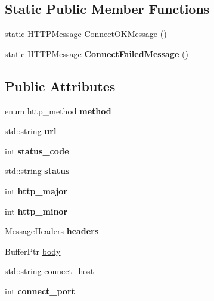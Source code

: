 \subsection*{Static Public Member Functions}
\begin{DoxyCompactItemize}
\item 
static \hyperlink{class_h_t_t_p_message}{H\+T\+T\+P\+Message} \hyperlink{class_h_t_t_p_message_af0ceacfc73f35fe05767205dce0e2a83}{Connect\+O\+K\+Message} ()
\item 
\mbox{\label{class_h_t_t_p_message_ae1eb6e84f448fdf85fda695e0b6b630b}} 
static \hyperlink{class_h_t_t_p_message}{H\+T\+T\+P\+Message} {\bfseries Connect\+Failed\+Message} ()
\end{DoxyCompactItemize}
\subsection*{Public Attributes}
\begin{DoxyCompactItemize}
\item 
\mbox{\label{class_h_t_t_p_message_adadaa62e7320300c7057a2981d961b21}} 
enum http\+\_\+method {\bfseries method}
\item 
\mbox{\label{class_h_t_t_p_message_aadb94b719433d792bcaceb83475dc84a}} 
std\+::string {\bfseries url}
\item 
\mbox{\label{class_h_t_t_p_message_a44f70655bc6bbaed93d76d62afefd089}} 
int {\bfseries status\+\_\+code}
\item 
\mbox{\label{class_h_t_t_p_message_ad36d08677d93aa4571754964db4126a6}} 
std\+::string {\bfseries status}
\item 
\mbox{\label{class_h_t_t_p_message_a5fe38fef11c64cec42f6b3bb07092c90}} 
int {\bfseries http\+\_\+major}
\item 
\mbox{\label{class_h_t_t_p_message_ab8aaf988b5630122f1ebdc8641bd6496}} 
int {\bfseries http\+\_\+minor}
\item 
\mbox{\label{class_h_t_t_p_message_a5af413527c237e8e91d6a6bd1395eae9}} 
Message\+Headers {\bfseries headers}
\item 
Buffer\+Ptr \hyperlink{class_h_t_t_p_message_a829d9bbdf115fdf2ade51fd83b3df289}{body}
\item 
std\+::string \hyperlink{class_h_t_t_p_message_ae2b74f937ddf8b95e786b481d63cd9d4}{connect\+\_\+host}
\item 
\mbox{\label{class_h_t_t_p_message_aa49fb8fdbc6560d00846d6ac29e97434}} 
int {\bfseries connect\+\_\+port}
\end{DoxyCompactItemize}
